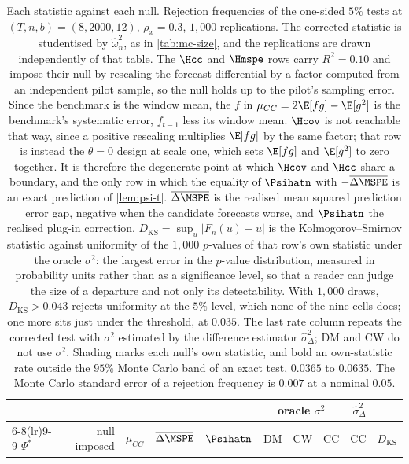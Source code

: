 \begin{table}[htbp]
\centering
\caption{Each statistic against each null. Rejection frequencies of the one-sided $5\%$ tests at $(T,n,b)=(8,2000,12)$, $\rho_x=0.3$, $1{,}000$ replications. The corrected statistic is studentised by $\hat\omega^2_n$, as in \cref{tab:mc-size}, and the replications are drawn independently of that table. The $\Hcc$ and $\Hmspe$ rows carry $R^2=0.10$ and impose their null by rescaling the forecast differential by a factor computed from an independent pilot sample, so the null holds up to the pilot's sampling error. Since the benchmark is the window mean, the $f$ in $\mu_{CC}=2\E[fg]-\E[g^2]$ is the benchmark's systematic error, $f_{t-1}$ less its window mean. $\Hcov$ is not reachable that way, since a positive rescaling multiplies $\E[fg]$ by the same factor; that row is instead the $\theta=0$ design at scale one, which sets $\E[fg]$ and $\E[g^2]$ to zero together. It is therefore the degenerate point at which $\Hcov$ and $\Hcc$ share a boundary, and the only row in which the equality of $\Psihatn$ with $-\overline{\Delta\MSPE}$ is an exact prediction of \cref{lem:psi-t}. $\overline{\Delta\MSPE}$ is the realised mean squared prediction error gap, negative when the candidate forecasts worse, and $\Psihatn$ the realised plug-in correction. $D_{\mathrm{KS}}=\sup_u|F_n(u)-u|$ is the Kolmogorov--Smirnov statistic against uniformity of the $1{,}000$ $p$-values of that row's own statistic under the oracle $\sigma^2$: the largest error in the $p$-value distribution, measured in probability units rather than as a significance level, so that a reader can judge the size of a departure and not only its detectability. With $1{,}000$ draws, $D_{\mathrm{KS}}>0.043$ rejects uniformity at the $5\%$ level, which none of the nine cells does; one more sits just under the threshold, at $0.035$. The last rate column repeats the corrected test with $\sigma^2$ estimated by the difference estimator $\hat\sigma^2_\Delta$; DM and CW do not use $\sigma^2$. Shading marks each null's own statistic, and bold an own-statistic rate outside the $95\%$ Monte Carlo band of an exact test, $0.0365$ to $0.0635$. The Monte Carlo standard error of a rejection frequency is $0.007$ at a nominal $0.05$.}
\label{tab:mc-grid}
\small
\begin{tabular}{lrrrrrrrrr}
\toprule
& & & & & \multicolumn{3}{c}{oracle $\sigma^2$} & $\hat\sigma^2_\Delta$ & \\
\cmidrule(lr){6-8}\cmidrule(lr){9-9}
$\Psi^*$ & null imposed & $\mu_{CC}$ & $\overline{\Delta\MSPE}$ & $\Psihatn$ & DM & CW & CC & CC & $D_{\mathrm{KS}}$ \\

\end{tabular}
\end{table}
